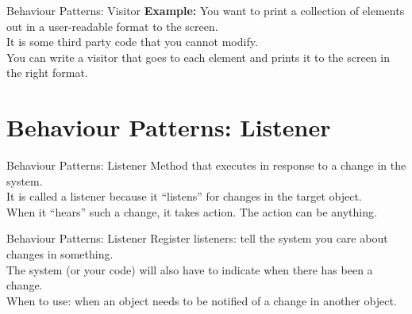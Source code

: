 \documentclass[14pt,aspectratio=169]{beamer}
\begin{document}
\begin{frame}{Behaviour Patterns: Visitor}
\textbf{Example:} You want to print a collection of elements out in a user-readable format to the screen. \\
\vspace{1em}
It is some third party code that you cannot modify.\\
\vspace{1em}
You can write a visitor that goes to each element and prints it to the screen in the right format. 
\end{frame}



\section*{Behaviour Patterns: Listener}



\begin{frame}{Behaviour Patterns: Listener}
Method that executes in response to a change in the system. \\
\vspace{1em}
It is called a listener because it ``listens'' for changes in the target object. \\
\vspace{1em}
When it ``hears'' such a change, it takes action. The action can be anything.
\end{frame}



\begin{frame}{Behaviour Patterns: Listener}
Register listeners: tell the system you care about changes in something. \\
\vspace{1em}
The system (or your code) will also have to indicate when there has been a change.\\
\vspace{1em}
When to use: when an object needs to be notified of a change in another object.
\end{frame}
\end{document}
